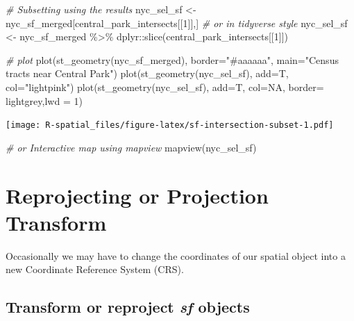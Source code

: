 \documentclass[
  11pt,
]{book}
\newenvironment{Shaded}{\begin{snugshade}}{\end{snugshade}}
\newcommand{\AttributeTok}[1]{\textcolor[rgb]{0.77,0.63,0.00}{#1}}
\newcommand{\CommentTok}[1]{\textcolor[rgb]{0.56,0.35,0.01}{\textit{#1}}}
\newcommand{\ConstantTok}[1]{\textcolor[rgb]{0.00,0.00,0.00}{#1}}
\newcommand{\DecValTok}[1]{\textcolor[rgb]{0.00,0.00,0.81}{#1}}
\newcommand{\FunctionTok}[1]{\textcolor[rgb]{0.00,0.00,0.00}{#1}}
\newcommand{\NormalTok}[1]{#1}
\newcommand{\OtherTok}[1]{\textcolor[rgb]{0.56,0.35,0.01}{#1}}
\newcommand{\SpecialCharTok}[1]{\textcolor[rgb]{0.00,0.00,0.00}{#1}}
\newcommand{\StringTok}[1]{\textcolor[rgb]{0.31,0.60,0.02}{#1}}
\begin{document}
\begin{Shaded}
\begin{Highlighting}[]
\CommentTok{\# Subsetting using the results}
\NormalTok{nyc\_sel\_sf }\OtherTok{\textless{}{-}}\NormalTok{ nyc\_sf\_merged[central\_park\_intersects[[}\DecValTok{1}\NormalTok{]],]}
\CommentTok{\# or in tidyverse style}
\NormalTok{nyc\_sel\_sf }\OtherTok{\textless{}{-}}\NormalTok{ nyc\_sf\_merged }\SpecialCharTok{\%\textgreater{}\%}\NormalTok{ dplyr}\SpecialCharTok{::}\FunctionTok{slice}\NormalTok{(central\_park\_intersects[[}\DecValTok{1}\NormalTok{]])}


\CommentTok{\# plot}
\FunctionTok{plot}\NormalTok{(}\FunctionTok{st\_geometry}\NormalTok{(nyc\_sf\_merged), }\AttributeTok{border=}\StringTok{"\#aaaaaa"}\NormalTok{, }\AttributeTok{main=}\StringTok{"Census tracts near Central Park"}\NormalTok{)}
\FunctionTok{plot}\NormalTok{(}\FunctionTok{st\_geometry}\NormalTok{(nyc\_sel\_sf), }\AttributeTok{add=}\NormalTok{T, }\AttributeTok{col=}\StringTok{"lightpink"}\NormalTok{)}
\FunctionTok{plot}\NormalTok{(}\FunctionTok{st\_geometry}\NormalTok{(nyc\_sel\_sf), }\AttributeTok{add=}\NormalTok{T, }\AttributeTok{col=}\ConstantTok{NA}\NormalTok{, }\AttributeTok{border=} \StringTok{\textquotesingle{}lightgrey\textquotesingle{}}\NormalTok{,}\AttributeTok{lwd =} \DecValTok{1}\NormalTok{)}
\end{Highlighting}
\end{Shaded}

\texttt{[image: R-spatial\_files/figure-latex/sf-intersection-subset-1.pdf]}

\begin{Shaded}
\begin{Highlighting}[]
\CommentTok{\# or Interactive map using mapview}
\FunctionTok{mapview}\NormalTok{(nyc\_sel\_sf)}
\end{Highlighting}
\end{Shaded}

\hypertarget{reprojecting-or-projection-transform}{%
\section{Reprojecting or Projection Transform}\label{reprojecting-or-projection-transform}}

Occasionally we may have to change the coordinates of our spatial object into a new Coordinate Reference System (CRS).

\hypertarget{transform-or-reproject-sf-objects-1}{%
\subsection{\texorpdfstring{Transform or reproject \textbf{\emph{sf}} objects}{Transform or reproject sf objects}}\label{transform-or-reproject-sf-objects-1}}
\end{document}

